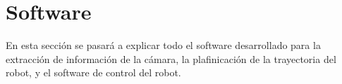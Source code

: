 \section{Software}
\label{software}
En esta sección se pasará a explicar todo el software desarrollado para la extracción de información de la cámara, la plafinicación de la trayectoria del robot, y el software de control del robot.



